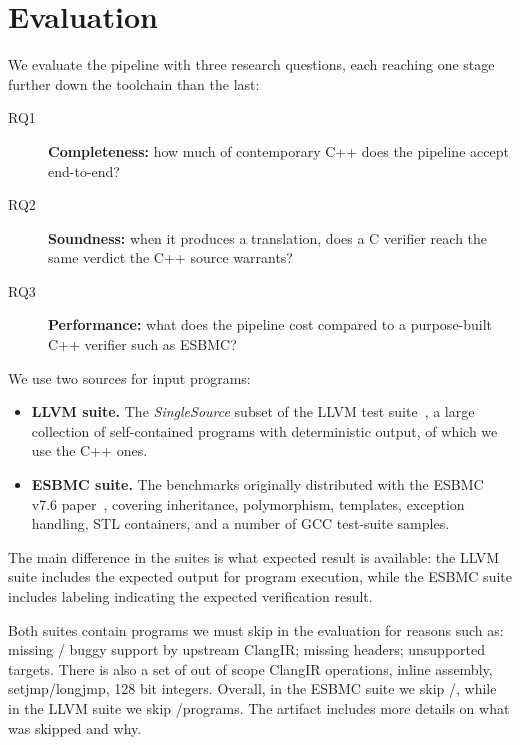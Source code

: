 \section{Evaluation}\label{sec:eval}

We evaluate the pipeline with three research questions, each reaching one stage further down the toolchain than the last:
\begin{description}
  \item[RQ1] \textbf{Completeness:} how much of contemporary C++ does the pipeline accept end-to-end?
  \item[RQ2] \textbf{Soundness:} when it produces a translation, does a C verifier reach the same verdict the C++ source warrants?
  \item[RQ3] \textbf{Performance:} what does the pipeline cost compared to a purpose-built C++ verifier such as ESBMC?
\end{description}

We use two sources for input programs:

\begin{itemize}
  \item \textbf{LLVM suite.} The \emph{SingleSource} subset of the LLVM test suite~\cite{llvmtestsuite}, a large collection of self-contained programs with deterministic output, of which we use the C++ ones. %
  \item \textbf{ESBMC suite.} The benchmarks originally distributed with the ESBMC v7.6 paper~\cite{esbmc76}, covering inheritance, polymorphism, templates, exception handling, STL containers, and a number of GCC test-suite samples. %
\end{itemize}

The main difference in the suites is what expected result is available: the LLVM suite includes the expected output for program execution, while the ESBMC suite includes labeling indicating the expected verification result. %

Both suites contain programs we must skip in the evaluation for reasons such as: missing / buggy support by upstream ClangIR; missing headers; unsupported targets. %
 There is also a set of out of scope ClangIR operations, \eg inline assembly, setjmp/longjmp, 128 bit integers. %
Overall, in the ESBMC suite we skip \esbmcSkipped /\esbmcTotal, while in the LLVM suite we skip \llvmSkipped /\llvmTotal programs. %
The artifact includes more details on what was skipped and why. %

